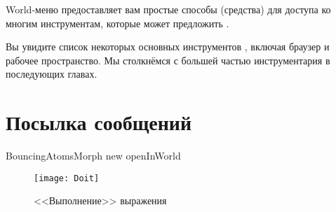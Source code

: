 \documentclass[a4paper,10pt,twoside]{book}
\begin{document}

World-меню предоставляет вам простые способы (средства) для доступа ко
многим инструментам, которые может предложить \pharo.




Вы увидите список некоторых основных инструментов \pharo,
включая браузер и рабочее пространство. Мы столкнёмся с большей
частью инструментария в последующих главах.

\section{Посылка сообщений}



\begin{code}{}
BouncingAtomsMorph new openInWorld
\end{code}



\begin{figure}[htb]
\centerline {\texttt{[image: Doit]}}
\caption{<<Выполнение>> выражения}
\end{figure}

\end{document}

